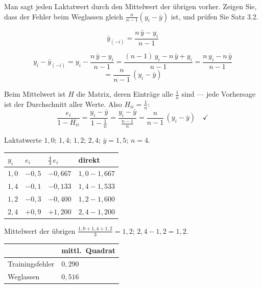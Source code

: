 \begin{aufgabe}
Man sagt jeden Laktatwert durch den Mittelwert der übrigen vorher. Zeigen Sie, dass der Fehler beim Weglassen gleich $\frac{n}{n-1}(y_i-\bar y)$ ist, und prüfen Sie Satz 3.2.

\loesung
{}
\[ \bar y_{(-i)} = \frac{n\,\bar y - y_i}{n-1} \]

\[ y_i - \bar y_{(-i)} = y_i - \frac{n\,\bar y - y_i}{n-1} = \frac{(n-1)\,y_i - n\,\bar y + y_i}{n-1} = \frac{n\,y_i - n\,\bar y}{n-1} \]
\[ = \frac{n}{n-1}\,(y_i-\bar y) \]

Beim Mittelwert ist $H$ die Matrix, deren Einträge alle $\tfrac1n$ sind --- jede Vorhersage ist der Durchschnitt aller Werte. Also $H_{ii} = \tfrac1n$:
\[ \frac{e_i}{1-H_{ii}} = \frac{y_i-\bar y}{1-\frac1n} = \frac{y_i-\bar y}{\frac{n-1}{n}} = \frac{n}{n-1}\,(y_i-\bar y) \quad \checkmark \]

Laktatwerte $1{,}0$; $1{,}4$; $1{,}2$; $2{,}4$; $\bar y = 1{,}5$; $n = 4$.

\begin{center}
{\small
\renewcommand{\arraystretch}{1.48}
\begin{tabular}{@{}P{1.4cm}P{1.8cm}P{2.2cm}P{2.2cm}@{}}
\toprule
$y_i$ & $e_i$ & $\frac43\,e_i$ & \textbf{direkt}\\
\midrule
$1{,}0$ & $-0{,}5$ & $-0{,}667$ & $1{,}0-1{,}667$\\
$1{,}4$ & $-0{,}1$ & $-0{,}133$ & $1{,}4-1{,}533$\\
$1{,}2$ & $-0{,}3$ & $-0{,}400$ & $1{,}2-1{,}600$\\
$2{,}4$ & $+0{,}9$ & $+1{,}200$ & $2{,}4-1{,}200$\\
\bottomrule
\end{tabular}}
\end{center}

 Mittelwert der übrigen $\frac{1{,}0+1{,}4+1{,}2}{3} = 1{,}2$; $2{,}4-1{,}2 = 1{,}2$. \checkmark

\begin{center}
{\small
\renewcommand{\arraystretch}{1.5}
\begin{tabular}{@{}P{3.0cm}P{2.4cm}@{}}
\toprule
& \textbf{mittl.\ Quadrat}\\
\midrule
Trainingsfehler & $0{,}290$\\
Weglassen & $0{,}516$\\
\bottomrule
\end{tabular}}
\end{center}


\end{aufgabe}
